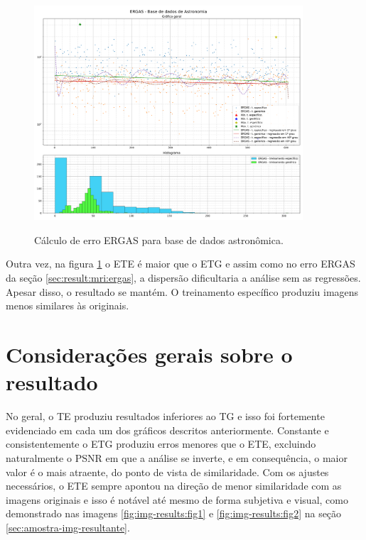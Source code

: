 \begin{figure}[H]
    \centering
    \caption{Cálculo de erro ERGAS para base de dados astronômica.}
    \includegraphics[width=10cm]{fig/resultados/astronomy/png/ergas_astronomy_compound.png}
    \label{fig:results:fig8}
\end{figure}

Outra vez, na figura \ref{fig:results:fig8} o ETE é maior que o ETG e assim como no erro ERGAS da seção \ref{sec:result:mri:ergas}, a dispersão dificultaria a análise sem as regressões. Apesar disso, o resultado se mantém. O treinamento específico produziu imagens menos similares às originais.

\section{Considerações gerais sobre o resultado}
\label{sec:result:consideracoes-gerais}

No geral, o TE produziu resultados inferiores ao TG e isso foi fortemente evidenciado em cada um dos gráficos descritos anteriormente. Constante e consistentemente o ETG produziu erros menores que o ETE, excluindo naturalmente o PSNR em que a análise se inverte, e em consequência, o maior valor é o mais atraente, do ponto de vista de similaridade. Com os ajustes necessários, o ETE sempre apontou na direção de menor similaridade com as imagens originais e isso é notável até mesmo de forma subjetiva e visual, como demonstrado nas imagens \ref{fig:img-results:fig1} e \ref{fig:img-results:fig2} na seção \ref{sec:amostra-img-resultante}.

